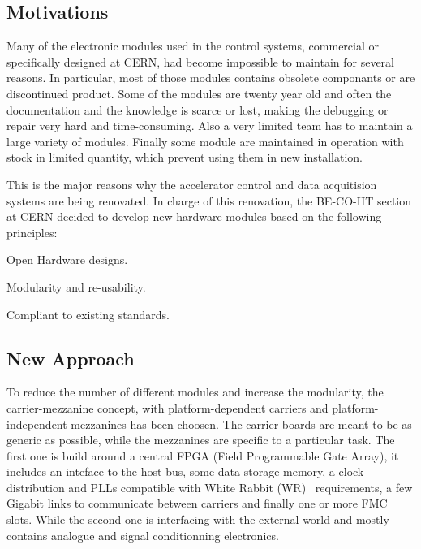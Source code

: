 \documentclass{JAC2003}
\begin{document}
\subsection{Motivations}
Many of the electronic modules used in the control systems, commercial or specifically designed at CERN, had become impossible to maintain for several reasons.
In particular, most of those modules contains obsolete componants or are discontinued product.
Some of the modules are twenty year old and often the documentation and the knowledge is scarce or lost, making the debugging or repair very hard and time-consuming.
Also a very limited team has to maintain a large variety of modules.
Finally some module are maintained in operation with stock in limited quantity, which prevent using them in new installation.

This is the major reasons why the accelerator control and data acquitision systems are being renovated.
In charge of this renovation, the BE-CO-HT section at CERN decided to develop new hardware modules based on the following principles:
\begin{Itemize}
\item Open Hardware designs.
\item Modularity and re-usability.
\item Compliant to existing standards.
\end{Itemize}

\subsection{New Approach}
To reduce the number of different modules and increase the modularity, the carrier-mezzanine concept, with platform-dependent carriers and platform-independent mezzanines has been choosen.
The carrier boards are meant to be as generic as possible, while the mezzanines are specific to a particular task.
The first one is build around a central FPGA (Field Programmable Gate Array), it includes an inteface to the host bus, some data storage memory, a clock distribution and PLLs compatible with White Rabbit (WR)~\cite{wr} requirements, a few Gigabit links to communicate between carriers and finally one or more FMC slots.
While the second one is interfacing with the external world and mostly contains analogue and signal conditionning electronics.
\end{document}
